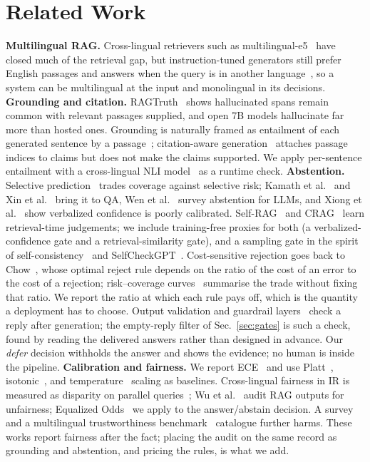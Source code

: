 \section{Related Work}\label{sec:related}
\textbf{Multilingual RAG.} Cross-lingual retrievers such as multilingual-e5~\cite{wang2024me5} have closed much of the retrieval gap, but instruction-tuned generators still prefer English passages and answers when the query is in another language~\cite{park2025langpref,yang2024langbias}, so a system can be multilingual at the input and monolingual in its decisions.
\textbf{Grounding and citation.} RAGTruth~\cite{niu2024ragtruth} shows hallucinated spans remain common with relevant passages supplied, and open 7B models hallucinate far more than hosted ones. Grounding is naturally framed as entailment of each generated sentence by a passage~\cite{honovich2022true}; citation-aware generation~\cite{gao2023alce} attaches passage indices to claims but does not make the claims supported. We apply per-sentence entailment with a cross-lingual NLI model~\cite{conneau2018xnli,he2023debertav3} as a runtime check.
\textbf{Abstention.} Selective prediction~\cite{elyaniv2010foundations,geifman2017selective,geifman2019selectivenet} trades coverage against selective risk; Kamath et al.~\cite{kamath2020selective} and Xin et al.~\cite{xin2021abstention} bring it to QA, Wen et al.~\cite{wen2025abstention} survey abstention for LLMs, and Xiong et al.~\cite{xiong2024verbalized} show verbalized confidence is poorly calibrated. Self-RAG~\cite{asai2024selfrag} and CRAG~\cite{yan2024crag} learn retrieval-time judgements; we include training-free proxies for both (a verbalized-confidence gate and a retrieval-similarity gate), and a sampling gate in the spirit of self-consistency~\cite{wang2023selfconsistency} and SelfCheckGPT~\cite{manakul2023selfcheckgpt}. Cost-sensitive rejection goes back to Chow~\cite{chow1970reject}, whose optimal reject rule depends on the ratio of the cost of an error to the cost of a rejection; risk--coverage curves~\cite{geifman2017selective} summarise the trade without fixing that ratio. We report the ratio at which each rule pays off, which is the quantity a deployment has to choose. Output validation and guardrail layers~\cite{rebedea2023nemo,inan2023llamaguard} check a reply after generation; the empty-reply filter of Sec.~\ref{sec:gates} is such a check, found by reading the delivered answers rather than designed in advance. Our \emph{defer} decision withholds the answer and shows the evidence; no human is inside the pipeline.
\textbf{Calibration and fairness.} We report ECE~\cite{guo2017calibration} and use Platt~\cite{platt1999probabilistic}, isotonic~\cite{zadrozny2002transforming}, and temperature~\cite{guo2017calibration} scaling as baselines. Cross-lingual fairness in IR is measured as disparity on parallel queries~\cite{yang2024fairness}; Wu et al.~\cite{wu2024ragfair} audit RAG outputs for unfairness; Equalized Odds~\cite{hardt2016equality} we apply to the answer/abstain decision. A survey~\cite{gallegos2024bias} and a multilingual trustworthiness benchmark~\cite{li2024xtrust} catalogue further harms. These works report fairness after the fact; placing the audit on the same record as grounding and abstention, and pricing the rules, is what we add.

